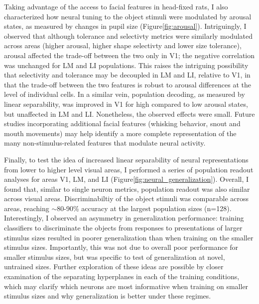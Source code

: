 Taking advantage of the access to facial features in head-fixed rats, I also characterized how neural tuning to the object stimuli were modulated by arousal states, as measured by changes in pupil size (Figure\ref{fig:arousal}). Intriguingly, I observed that although tolerance and selectivty metrics were similarly modulated across areas (higher arousal, higher shape selectivty and lower size tolerance), arousal affected the trade-off between the two only in V1; the negative correlation was unchanged for LM and LI populations. This raises the intriguing possibility that selectivity and tolerance may be decoupled in LM and LI, relative to V1, in that the trade-off between the two features is robust to arousal differences at the level of individual cells. In a similar vein, population decoding, as measured by linear separability, was improved in V1 for high compared to low arousal states, but unaffected in LM and LI. Nonetheless, the observed effects were small. Future studies incorporating additional facial features (whisking behavior, snout and mouth movements) may help identify a more complete representation of the many non-stimulus-related features that modulate neural activity.

Finally, to test the idea of increased linear separability of neural representations from lower to higher level visual areas, I performed a series of population readout analyses for areas V1, LM, and LI (Figure\ref{fig:neural_generalization}). Overall, I found that, similar to single neuron metrics, population readout was also similar across visual areas. Discriminabiltiy of the object stimuli was comparable across areas, reaching $\sim$80-90\% accuracy at the largest population sizes (n=128). Interestingly, I observed an asymmetry in generalization performance:  training classifiers to discriminate the objects from responses to presentations of larger stimulus sizes resulted in poorer generalization than when training on the smaller stimulus sizes. Importantly, this was not due to overall poor performance for smaller stimulus sizes, but was specific to test of generalization at novel, untrained sizes. Further exploration of these ideas are possible by closer examination of the separating hyperplanes in each of the training conditions, which may clarify which neurons are most informative when training on smaller stimulus sizes and why generalization is better under these regimes. 

